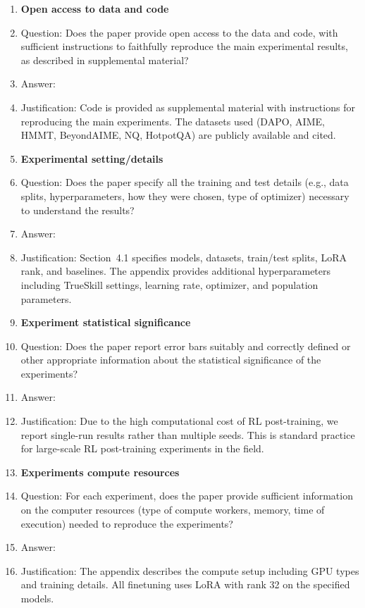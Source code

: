 \begin{enumerate}
\item {\bf Open access to data and code}
    \item[] Question: Does the paper provide open access to the data and code, with sufficient instructions to faithfully reproduce the main experimental results, as described in supplemental material?
    \item[] Answer: \answerYes{}
    \item[] Justification: Code is provided as supplemental material with instructions for reproducing the main experiments. The datasets used (DAPO, AIME, HMMT, BeyondAIME, NQ, HotpotQA) are publicly available and cited.

\item {\bf Experimental setting/details}
    \item[] Question: Does the paper specify all the training and test details (e.g., data splits, hyperparameters, how they were chosen, type of optimizer) necessary to understand the results?
    \item[] Answer: \answerYes{}
    \item[] Justification: Section~4.1 specifies models, datasets, train/test splits, LoRA rank, and baselines. The appendix provides additional hyperparameters including TrueSkill settings, learning rate, optimizer, and population parameters.

\item {\bf Experiment statistical significance}
    \item[] Question: Does the paper report error bars suitably and correctly defined or other appropriate information about the statistical significance of the experiments?
    \item[] Answer: \answerNo{}
    \item[] Justification: Due to the high computational cost of RL post-training, we report single-run results rather than multiple seeds. This is standard practice for large-scale RL post-training experiments in the field.

\item {\bf Experiments compute resources}
    \item[] Question: For each experiment, does the paper provide sufficient information on the computer resources (type of compute workers, memory, time of execution) needed to reproduce the experiments?
    \item[] Answer: \answerYes{}
    \item[] Justification: The appendix describes the compute setup including GPU types and training details. All finetuning uses LoRA with rank 32 on the specified models.


\end{enumerate}
